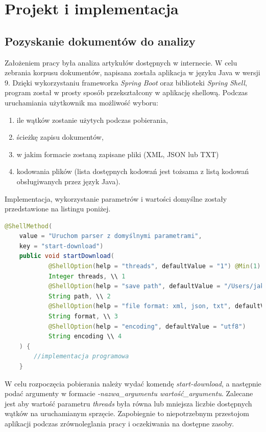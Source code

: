 
\chapter{Projekt i implementacja}

\section{Pozyskanie dokumentów do analizy}
Założeniem pracy była analiza artykułów dostępnych w internecie. W celu zebrania korpusu dokumentów, napisana została aplikacja w języku Java w wersji 9. Dzięki wykorzystaniu frameworka \textit{Spring Boot} oraz biblioteki \textit{Spring Shell}, program został w prosty sposób przekształcony w aplikację shellową. Podczas uruchamiania użytkownik ma możliwość wyboru:
\begin{enumerate}
\setlength\itemsep{0.6em}
\item ile wątków zostanie użytych podczas pobierania,
\item ścieżkę zapisu dokumentów,
\item w jakim formacie zostaną zapisane pliki (XML, JSON lub TXT)
\item kodowania plików (lista dostępnych kodowań jest tożsama z listą kodowań obsługiwanych przez język Java).
\end{enumerate}
Implementacja, wykorzystanie parametrów i wartości domyślne zostały przedstawione na listingu poniżej.
\begin{lstlisting}[language=Java, basicstyle=\tiny, style=javaStyle]
	@ShellMethod(
    value = "Uruchom parser z domyślnymi parametrami", 
    key = "start-download")
	public void startDownload(
			@ShellOption(help = "threads", defaultValue = "1") @Min(1) 
            Integer threads, \\ 1
			@ShellOption(help = "save path", defaultValue = "/Users/jakub/Desktop") 
            String path, \\ 2
			@ShellOption(help = "file format: xml, json, txt", defaultValue = "xml") 
            String format, \\ 3
			@ShellOption(help = "encoding", defaultValue = "utf8") 
            String encoding \\ 4
	) {
		//implementacja programowa
	}
\end{lstlisting}
W celu rozpoczęcia pobierania należy wydać komendę \textit{start-download}, a następnie podać argumenty w formacie \textit{-nazwa\_argumentu wartość\_argumentu}. Zalecane jest aby wartość parametru \textit{threads} była równa lub mniejsza liczbie dostępnych wątków na uruchamianym sprzęcie. Zapobiegnie to niepotrzebnym przestojom aplikacji podczas zrównoleglania pracy i oczekiwania na dostępne zasoby. 
% 
% 

